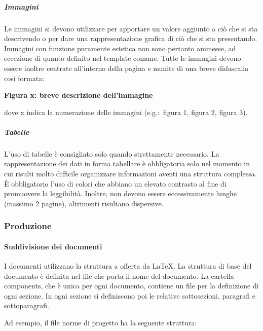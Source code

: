 \documentclass[../norme-di-progetto.tex]{subfiles}
\begin{document}
\subparagraph{Immagini}%
\label{subp:immagini}
Le immagini si devono utilizzare per apportare un valore aggiunto a ciò che si sta descrivendo o per dare una rappresentazione grafica di ciò che si sta presentando.
Immagini con funzione puramente estetica non sono pertanto ammesse, ad eccezione di quanto definito nel template comune.
Tutte le immagini devono essere inoltre centrate all'interno della pagina e munite di una breve didascalia così formata:
\begin{center}
  \textbf{Figura x: breve descrizione dell'immagine}
\end{center}
dove x indica la numerazione delle immagini (e.g.:\ figura 1, figura 2, figura 3).

\subparagraph{Tabelle}%
\label{subp:tabelle}
L'uso di tabelle è consigliato solo quando strettamente necessario. La rappresentazione dei dati in forma tabellare è obbligatoria solo nel momento in cui risulti molto difficile organizzare informazioni aventi una struttura complessa. È obbligatorio l'uso di colori che abbiano un elevato contrasto al fine di promuovere la leggibilità. Inoltre, non devono essere eccessivamente lunghe (massimo 2 pagine), altrimenti risultano dispersive.

\subsubsection{Produzione}%
\label{subs:produzione}

\paragraph{Suddivisione dei documenti}%
\label{par:suddivisione_dei_documenti}
I documenti utilizzano la struttura a  offerta da \LaTeX.
La struttura di base del documento è definita nel file che porta il nome del documento.
La cartella components, che è unica per ogni documento, contiene un file per la definizione di ogni sezione. In ogni sezione si definiscono poi le relative sottosezioni, paragrafi e sottoparagrafi.

Ad esempio, il file norme di progetto ha la seguente struttura:
\end{document}
